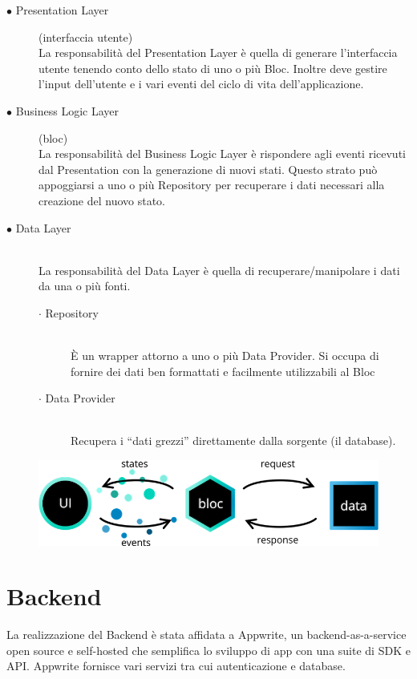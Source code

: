 \documentclass[a4paper, oneside, 12pt]{article}
\begin{document}
\begin{description}
	\item [$\bullet$ Presentation Layer] (interfaccia utente) \hfill \\
	La responsabilità del Presentation Layer è quella di generare l'interfaccia utente tenendo conto dello stato di uno o più Bloc. 
	Inoltre deve gestire l'input dell'utente e i vari eventi del ciclo di vita dell'applicazione.
	\item [$\bullet$ Business Logic Layer] (bloc) \hfill \\
	La responsabilità del Business Logic Layer è rispondere agli eventi ricevuti dal Presentation con la generazione di nuovi stati. 
	Questo strato può appoggiarsi a uno o più Repository per recuperare i dati necessari alla creazione del nuovo stato.
	\item [$\bullet$ Data Layer] \hfill \\
	La responsabilità del Data Layer è quella di recuperare/manipolare i dati da una o più fonti.
	\begin{description}
		\item [$\cdot$ Repository] \hfill \\ 
		È un wrapper attorno a uno o più Data Provider. Si occupa di fornire dei dati ben formattati e facilmente utilizzabili al Bloc
		\item [$\cdot$ Data Provider] \hfill \\
		Recupera i “dati grezzi” direttamente dalla sorgente (il database).
	\end{description}
\end{description}

\begin{figure}[H]
	\centering
	\includegraphics[width = 12 cm]{images/bloc_architecture.png}
	\label{fig:Architettura BLoC}
\end{figure}

\newpage

\section{Backend}
La realizzazione del Backend è stata affidata a Appwrite, un backend-as-a-service open source e self-hosted che semplifica lo sviluppo
di app con una suite di SDK e API. Appwrite fornisce vari servizi tra cui autenticazione e database.
\end{document}
